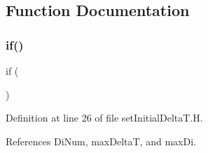 \label{_Description}%


\subsection{Function Documentation}
\mbox{\label{setInitialDeltaT_8H_ae64d60def649600fb9f624abf0393592}} 
\subsubsection{\texorpdfstring{if()}{if()}}
{\footnotesize\ttfamily if (\begin{DoxyParamCaption}\item[{\hyperlink{main_2include_2setDeltaT_8H_af3d9603ccf803ea89289206f9f81bdf0}{adjust\+Time\+Step}}]{ }\end{DoxyParamCaption})}



Definition at line 26 of file set\+Initial\+Delta\+T.\+H.



References Di\+Num, max\+DeltaT, and max\+Di.

